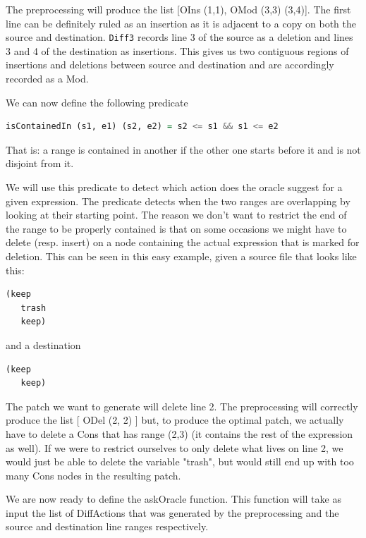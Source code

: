 \documentclass[11pt]{article}
\begin{document}
The preprocessing will produce the list [OIns (1,1), OMod (3,3) (3,4)]. The 
first line can be definitely ruled as an insertion as it is adjacent to a copy 
on both the source and destination. \texttt{Diff3} records line 3 of the source 
as a deletion and lines 3 and 4 of the destination as insertions. This gives us 
two contiguous regions of insertions and deletions between source and 
destination and are accordingly recorded as a Mod. 

We can now define the following predicate

\begin{lstlisting}[language=haskell]
  isContainedIn (s1, e1) (s2, e2) = s2 <= s1 && s1 <= e2
\end{lstlisting}
That is: a range is contained in another if the other one starts before it and 
is not disjoint from it.

We will use this predicate to detect which action does the oracle suggest for 
a given expression. The predicate detects when the two ranges are overlapping by 
looking at their starting point. The reason we don't want to restrict the end of 
the range to be properly contained is that on some occasions we might have to 
delete (resp. insert) on a node containing the actual expression that is marked for 
deletion. This can be seen in this easy example, given a source file that looks 
like this:

\begin{lstlisting}[language=lisp]
 (keep
   trash
   keep)
\end{lstlisting}

and a destination 

\begin{lstlisting}[language=lisp]
 (keep
   keep)
\end{lstlisting}

The patch we want to generate will delete line 2. The preprocessing will correctly produce the list [ ODel (2, 2) ] 
but, to produce the optimal patch, we actually have to delete a Cons that has 
range (2,3) (it contains the rest of the expression as well). If we were to restrict ourselves to only delete 
what lives on line 2, we would just be able to delete the variable "trash", but would still end up with too 
many Cons nodes in the resulting patch.

We are now ready to define the askOracle function. This function will take as input the list of DiffActions that 
was generated by the preprocessing and the source and destination line ranges respectively. 
\end{document}
